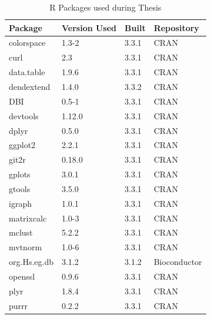 \begin{longtable}{|llll|}
\caption{R Packages used during Thesis}
\label{tab:computers_r_packages}
\\
\multicolumn{1}{l}{Package}      & \multicolumn{1}{l}{Version Used} & \multicolumn{1}{l}{Built} & \multicolumn{1}{l}{Repository}      \\
\hline  \rowcolor{gray!25}
colorspace   & 1.3-2          & 3.3.1 & CRAN            \\
\hline
curl         & 2.3            & 3.3.1 & CRAN            \\
\hline  \rowcolor{gray!25}
data.table   & 1.9.6          & 3.3.1 & CRAN            \\
\hline
dendextend   & 1.4.0          & 3.3.2 & CRAN            \\
\hline  \rowcolor{gray!25}
DBI          & 0.5-1          & 3.3.1 & CRAN            \\
\hline
devtools     & 1.12.0         & 3.3.1 & CRAN            \\
\hline  \rowcolor{gray!25}
dplyr        & 0.5.0          & 3.3.1 & CRAN            \\
\hline
ggplot2      & 2.2.1          & 3.3.1 & CRAN            \\
\hline  \rowcolor{gray!25}
git2r        & 0.18.0         & 3.3.1 & CRAN            \\
\hline
gplots       & 3.0.1          & 3.3.1 & CRAN            \\
\hline  \rowcolor{gray!25}
gtools       & 3.5.0          & 3.3.1 & CRAN            \\
\hline
igraph       & 1.0.1          & 3.3.1 & CRAN            \\
\hline  \rowcolor{gray!25}
matrixcalc   & 1.0-3          & 3.3.1 & CRAN            \\
\hline
mclust       & 5.2.2          & 3.3.1 & CRAN            \\
\hline  \rowcolor{gray!25}
mvtnorm      & 1.0-6          & 3.3.1 & CRAN            \\
\hline
org.Hs.eg.db & 3.1.2          & 3.1.2 & Bioconductor    \\
\hline  \rowcolor{gray!25}
openssl      & 0.9.6          & 3.3.1 & CRAN            \\
\hline
plyr         & 1.8.4          & 3.3.1 & CRAN            \\
\hline  \rowcolor{gray!25}
purrr        & 0.2.2          & 3.3.1 & CRAN            \\

\end{longtable}
